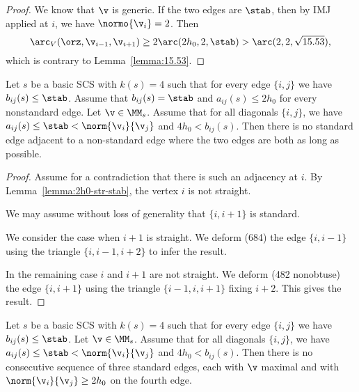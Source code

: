 \begin{proof}  
We know that $\v$ is generic.
If the two edges are $\stab$, then by IMJ applied at $i$, we have $\normo{\v_i}=2$.
Then
\[
\arc_V(\orz,\v_{i-1},\v_{i+1}) \ge 2 \arc(2h_0,2,\stab) > \arc(2,2,\sqrt{15.53}),
\]
which is contrary to Lemma~\ref{lemma:15.53}.
\end{proof}

\begin{lemma}[]\label{lemma:std-non-std}
Let $s$ be a basic SCS with $k(s)=4$
such that for every edge $\{i,j\}$ we have $b_{ij}(s)\le\stab$.
Assume that $b_{ij}(s) =\stab$ and $a_{ij}(s)\le 2h_0$ for every nonstandard edge.
Let $\v\in \MM_s$.  
Assume that
for all diagonals $\{i,j\}$, we have
$a_{ij}(s)\le \stab < \norm{\v_i}{\v_j}$ and $4h_0 < b_{ij}(s)$.
Then there is no standard edge adjacent to a non-standard edge where the two edges are both as long as possible.
\end{lemma}

\begin{proof}
Assume for a contradiction that there is such an adjacency at $i$.
By Lemma~\ref{lemma:2h0-str-stab}, the vertex $i$ is not straight.

We may assume without loss of generality that $\{i,i+1\}$ is standard.

We consider the case when $i+1$ is straight.  We deform (684) the edge $\{i,i-1\}$ using
the triangle $\{i,i-1,i+2\}$  to infer the result.

In the remaining case $i$ and $i+1$ are not straight.  We deform (482 nonobtuse) the edge $\{i,i+1\}$ using
the triangle $\{i-1,i,i+1\}$ fixing $i+2$.  This gives the result.
\end{proof}

\begin{lemma}[]
Let $s$ be a basic SCS with $k(s)=4$
such that for every edge $\{i,j\}$ we have $b_{ij}(s)\le\stab$.
Let $\v\in \MM_s$.  
Assume that
for all diagonals $\{i,j\}$, we have
$a_{ij}(s)\le \stab < \norm{\v_i}{\v_j}$ and $4h_0 < b_{ij}(s)$.
Then there is no consecutive sequence of three standard edges, each with $\v$ maximal
and with $\norm{\v_i}{\v_j}\ge 2h_0$ on the fourth edge.
\end{lemma}

